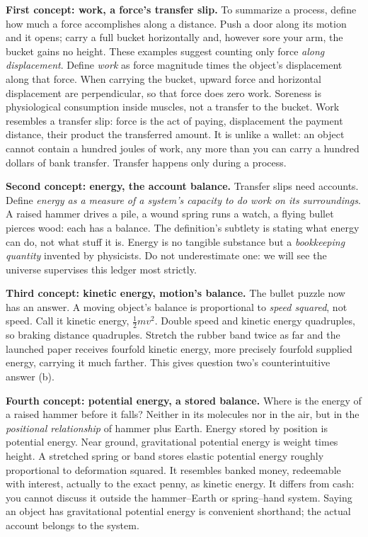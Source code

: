 \begin{mainline}
\textbf{First concept: work, a force's transfer slip.} To summarize a process, define how much a force accomplishes along a distance. Push a door along its motion and it opens; carry a full bucket horizontally and, however sore your arm, the bucket gains no height. These examples suggest counting only force \emph{along displacement}. Define \emph{work} as force magnitude times the object's displacement along that force. When carrying the bucket, upward force and horizontal displacement are perpendicular, so that force does zero work. Soreness is physiological consumption inside muscles, not a transfer to the bucket. Work resembles a transfer slip: force is the act of paying, displacement the payment distance, their product the transferred amount. It is unlike a wallet: an object cannot contain a hundred joules of work, any more than you can carry a hundred dollars of bank transfer. Transfer happens only during a process.

\textbf{Second concept: energy, the account balance.} Transfer slips need accounts. Define \emph{energy as a measure of a system's capacity to do work on its surroundings}. A raised hammer drives a pile, a wound spring runs a watch, a flying bullet pierces wood: each has a balance. The definition's subtlety is stating what energy can do, not what stuff it is. Energy is no tangible substance but a \emph{bookkeeping quantity} invented by physicists. Do not underestimate one: we will see the universe supervises this ledger most strictly.

\textbf{Third concept: kinetic energy, motion's balance.} The bullet puzzle now has an answer. A moving object's balance is proportional to \emph{speed squared}, not speed. Call it kinetic energy, \(\frac{1}{2}mv^2\). Double speed and kinetic energy quadruples, so braking distance quadruples. Stretch the rubber band twice as far and the launched paper receives fourfold kinetic energy, more precisely fourfold supplied energy, carrying it much farther. This gives question two's counterintuitive answer (b).

\textbf{Fourth concept: potential energy, a stored balance.} Where is the energy of a raised hammer before it falls? Neither in its molecules nor in the air, but in the \emph{positional relationship} of hammer plus Earth. Energy stored by position is potential energy. Near ground, gravitational potential energy is weight times height. A stretched spring or band stores elastic potential energy roughly proportional to deformation squared. It resembles banked money, redeemable with interest, actually to the exact penny, as kinetic energy. It differs from cash: you cannot discuss it outside the hammer--Earth or spring--hand system. Saying an object has gravitational potential energy is convenient shorthand; the actual account belongs to the system.


\end{mainline}
